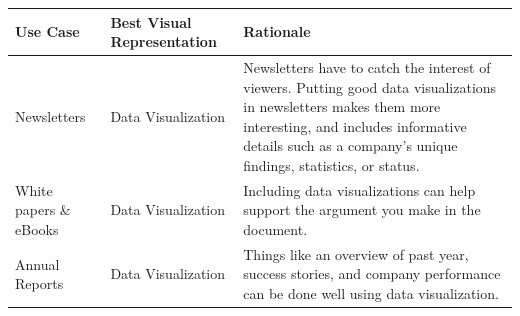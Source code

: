 \documentclass[]{book}
\theoremstyle{definition}
\theoremstyle{definition}
\theoremstyle{definition}
\theoremstyle{remark}
\begin{document}
\begin{longtable}[]{@{}lll@{}}
\toprule
\begin{minipage}[b]{0.11\columnwidth}\raggedright\strut
Use Case\strut
\end{minipage} & \begin{minipage}[b]{0.34\columnwidth}\raggedright\strut
Best Visual Representation\strut
\end{minipage} & \begin{minipage}[b]{0.13\columnwidth}\raggedright\strut
Rationale\strut
\end{minipage}\tabularnewline
\midrule
\endhead
\begin{minipage}[t]{0.11\columnwidth}\raggedright\strut
Newsletters\strut
\end{minipage} & \begin{minipage}[t]{0.34\columnwidth}\raggedright\strut
Data Visualization\strut
\end{minipage} & \begin{minipage}[t]{0.13\columnwidth}\raggedright\strut
Newsletters have to catch the interest of viewers. Putting good data
visualizations in newsletters makes them more interesting, and includes
informative details such as a company's unique findings, statistics, or
status.\strut
\end{minipage}\tabularnewline
\begin{minipage}[t]{0.11\columnwidth}\raggedright\strut
White papers \& eBooks\strut
\end{minipage} & \begin{minipage}[t]{0.34\columnwidth}\raggedright\strut
Data Visualization\strut
\end{minipage} & \begin{minipage}[t]{0.13\columnwidth}\raggedright\strut
Including data visualizations can help support the argument you make in
the document.\strut
\end{minipage}\tabularnewline
\begin{minipage}[t]{0.11\columnwidth}\raggedright\strut
Annual Reports\strut
\end{minipage} & \begin{minipage}[t]{0.34\columnwidth}\raggedright\strut
Data Visualization\strut
\end{minipage} & \begin{minipage}[t]{0.13\columnwidth}\raggedright\strut
Things like an overview of past year, success stories, and company
performance can be done well using data visualization.\strut
\end{minipage}\tabularnewline

\end{longtable}
\end{document}
